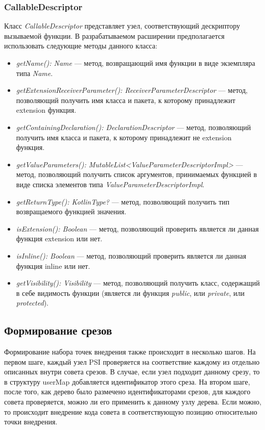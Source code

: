 \subsubsection{CallableDescriptor}
\label{ssub:callable_descriptor_description}
Класс \textit{CallableDescriptor} представляет узел, соответствующий
дескриптору вызываемой функции.
В разрабатываемом расширении предполагается использовать следующие методы
данного класса:
\begin{itemize}
	\item \textit{getName(): Name} --- метод, возвращающий имя функции в виде
		экземпляра типа \textit{Name}.
	\item \textit{getExtensionReceiverParameter(): ReceiverParameterDescriptor}
		--- метод, позволяющий получить имя класса и пакета, к которому принадлежит
		 extension функция.
	\item \textit{getContainingDeclaration(): DeclarationDescriptor} --- метод,
		позволяющий получить имя класса и пакета, к которому принадлежит не
		extension функция.
	\item \textit{getValueParameters(): MutableList<ValueParameterDescriptorImpl>}
		--- метод, позволяющий получить список аргументов, принимаемых функцией в виде списка элементов типа \textit{ValueParameterDescriptorImpl}.
	\item \textit{getReturnType(): KotlinType?} --- метод, позволяющий получить
		тип возвращаемого функцией значения.
	\item \textit{isExtension(): Boolean} --- метод, позволяющий проверить
		является ли данная функция extension или нет.
	\item \textit{isInline(): Boolean} --- метод, позволяющий проверить
		является ли данная функция inline или нет.
	\item \textit{getVisibility(): Visibility} --- метод, позволяющий получить
		класс, содержащий в себе видимость функции (является ли функция \textit{public}, или \textit{private}, или \textit{protected}).
\end{itemize}
\subsection{Формирование срезов}
\label{ssec:pointcut_creation_description}
Формирование набора точек внедрения также происходит в несколько шагов.
На первом шаге, каждый узел PSI проверяется на соответствие каждому из отдельно
описанных внутри совета срезов.
В случае, если узел подходит данному срезу, то в структуру userMap добавляется
идентификатор этого среза.
На втором шаге, после того, как дерево было размечено идентификаторами срезов, 
для каждого совета проверяется, можно ли его применить к данному узлу дерева.
Если можно, то происходит внедрение кода совета в соответствующую позицию
относительно точки внедрения.

